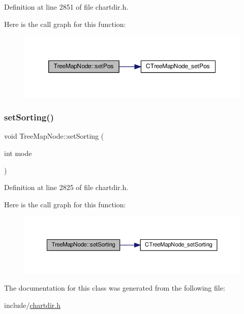 Definition at line 2851 of file chartdir.\+h.

Here is the call graph for this function\+:
\nopagebreak
\begin{figure}[H]
\begin{center}
\leavevmode
\includegraphics[width=350pt]{class_tree_map_node_a739d1874f5c0496388eeeb9bd4849f49_cgraph}
\end{center}
\end{figure}
\mbox{\label{class_tree_map_node_a74a1dc8d01616426a35aa8d5291ccaf9}} 
\subsubsection{\texorpdfstring{set\+Sorting()}{setSorting()}}
{\footnotesize\ttfamily void Tree\+Map\+Node\+::set\+Sorting (\begin{DoxyParamCaption}\item[{int}]{mode }\end{DoxyParamCaption})\hspace{0.3cm}{\ttfamily [inline]}}



Definition at line 2825 of file chartdir.\+h.

Here is the call graph for this function\+:
\nopagebreak
\begin{figure}[H]
\begin{center}
\leavevmode
\includegraphics[width=350pt]{class_tree_map_node_a74a1dc8d01616426a35aa8d5291ccaf9_cgraph}
\end{center}
\end{figure}


The documentation for this class was generated from the following file\+:\begin{DoxyCompactItemize}
\item 
include/\hyperlink{chartdir_8h}{chartdir.\+h}\end{DoxyCompactItemize}
